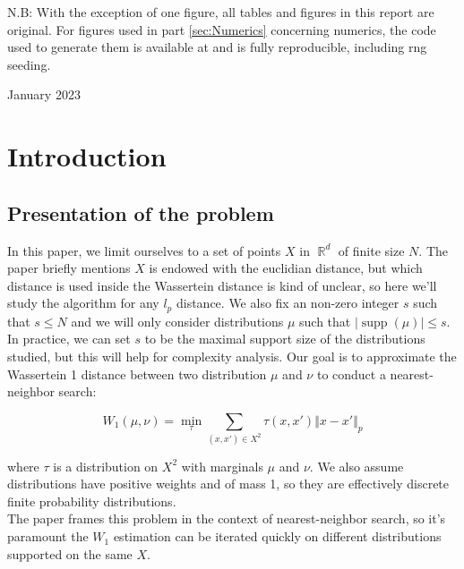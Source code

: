 \documentclass[11pt]{article}
\DeclareMathOperator\supp{supp}
\DeclareMathOperator\R{\mathbb{R}}
\begin{document}
\begin{titlepage}
N.B: With the exception of one figure, all tables and figures in this report are original. For figures used in part \ref{sec:Numerics} concerning numerics, the code used to generate them is available at \cite{MyRepo} and is fully reproducible, including rng seeding. %

\vfill

\centering
{\large January 2023\par} %

\end{titlepage}

\section{Introduction}

\subsection{Presentation of the problem}
In this paper, we limit ourselves to a set of points $X$ in $\R^d$ of finite size $N$. The paper briefly mentions $X$ is endowed with the euclidian distance, but which distance is used inside the Wassertein distance is kind of unclear, so here we'll study the algorithm for any $l_p$ distance. We also fix an non-zero integer $s$ such that $s \leq N$ and we will only consider distributions $\mu$ such that $\vert \supp(\mu) \vert \leq s$. In practice, we can set $s$ to be the maximal support size of the distributions studied, but this will help for complexity analysis. Our goal is to approximate the Wassertein 1 distance between two distribution $\mu$ and $\nu$ to conduct a nearest-neighbor search:

$$
W_1(\mu, \nu) = \min_{\tau} \sum_{\left( x, x' \right) \in X^2 } \tau(x, x') \Vert x - x' \Vert_p
$$

where $\tau$ is a distribution on $X^2$ with marginals $\mu$ and $\nu$. We also assume distributions have positive weights and of mass 1, so they are effectively discrete finite probability distributions.\\
The paper frames this problem in the context of nearest-neighbor search, so it's paramount the $W_1$ estimation can be iterated quickly on different distributions supported on the same $X$.
\end{document}
